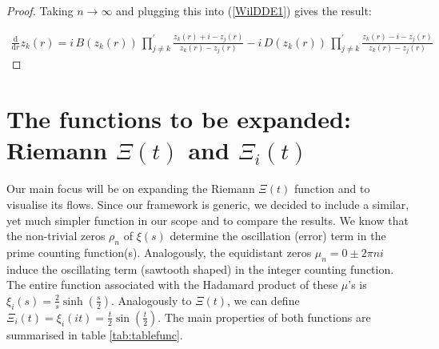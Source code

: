 \documentclass[a4paper,11pt,twoside]{amsart}
\newcommand{\verifiedeq}{=}
\newcommand{\defeq}{=}
\newcommand{\verifiedeq}{\stackrel{\checkmark}{=}}
\newcommand{\defeq}{\stackrel{\scriptscriptstyle \textnormal{def}}{=}}
\begin{document}
\begin{proof}
Taking $n \rightarrow \infty$ and plugging this into (\ref{WilDDE1}) gives the result:

\begin{align} \label{WilDDE2}
 \frac{\mathrm{d}}{\mathrm{d} r}z_k(r) \verifiedeq i\,B(z_k(r))\, \prod^{'}_{j \ne k} \frac{z_k(r)+i-z_j(r)}{z_k(r)-z_j(r)} -i\,D(z_k(r))\,\prod^{'}_{j \ne k} \frac{z_k(r)-i-z_j(r)}{z_k(r)-z_j(r)}
\end{align}
\end{proof}

\section{The functions to be expanded: Riemann $\Xi(t)$ and $\Xi_i(t)$} \label{functobexpanded}
Our main focus will be on expanding the Riemann $\Xi(t)$ function and to visualise its flows. Since our framework is generic, we decided to include a similar, yet much simpler function in our scope and to compare the results. We know that the non-trivial zeros $\rho_n$ of $\xi(s)$ determine the oscillation (error) term in the prime counting function(s). Analogously, the equidistant zeros $\mu_n\verifiedeq 0 \pm 2\pi n i$ induce the oscillating term (sawtooth shaped) in the integer counting function. The entire function associated with the Hadamard product of these $\mu$'s is $\xi_i(s) \defeq \frac{2}{s}\sinh\left(\frac{s}{2}\right)$. Analogously to $\Xi(t)$, we can define $\Xi_i(t) \defeq  \xi_i\left(it\right) \defeq \frac{t}{2}\sin\left(\frac{t}{2}\right)$. The main properties of both functions are summarised in table \ref{tab:tablefunc}.
\end{document}
